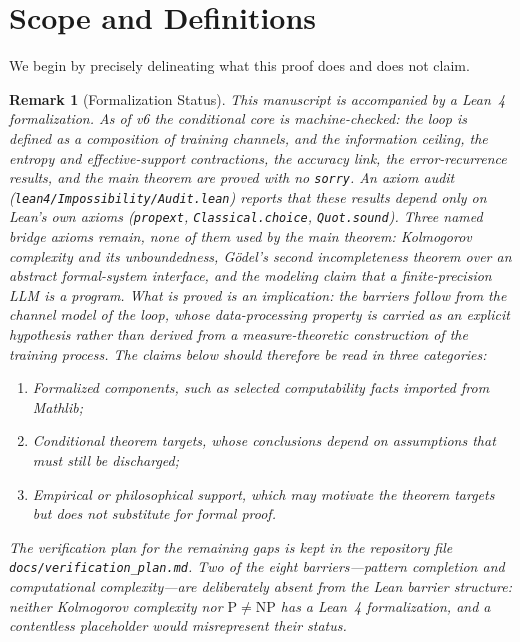 \documentclass[11pt,a4paper]{article}
\newtheorem{remark}[theorem]{Remark}
\begin{document}
\tableofcontents
\newpage

\section{Scope and Definitions}

We begin by precisely delineating what this proof does and does not claim.

\begin{remark}[Formalization Status]
This manuscript is accompanied by a Lean~4 formalization. As of v6 the conditional core is machine-checked: the loop is defined as a composition of training channels, and the information ceiling, the entropy and effective-support contractions, the accuracy link, the error-recurrence results, and the main theorem are proved with no \texttt{sorry}. An axiom audit (\texttt{lean4/Impossibility/Audit.lean}) reports that these results depend only on Lean's own axioms (\texttt{propext}, \texttt{Classical.choice}, \texttt{Quot.sound}). Three named bridge axioms remain, none of them used by the main theorem: Kolmogorov complexity and its unboundedness, G\"{o}del's second incompleteness theorem over an abstract formal-system interface, and the modeling claim that a finite-precision LLM is a program. What is proved is an implication: the barriers follow \emph{from} the channel model of the loop, whose data-processing property is carried as an explicit hypothesis rather than derived from a measure-theoretic construction of the training process. The claims below should therefore be read in three categories:
\begin{enumerate}
    \item \emph{Formalized components}, such as selected computability facts imported from Mathlib;
    \item \emph{Conditional theorem targets}, whose conclusions depend on assumptions that must still be discharged;
    \item \emph{Empirical or philosophical support}, which may motivate the theorem targets but does not substitute for formal proof.
\end{enumerate}
The verification plan for the remaining gaps is kept in the repository file \texttt{docs/\allowbreak verification\_\allowbreak plan.md}. Two of the eight barriers---pattern completion and computational complexity---are deliberately absent from the Lean barrier structure: neither Kolmogorov complexity nor $\mathrm{P} \neq \mathrm{NP}$ has a Lean~4 formalization, and a contentless placeholder would misrepresent their status.
\end{remark}
\end{document}
